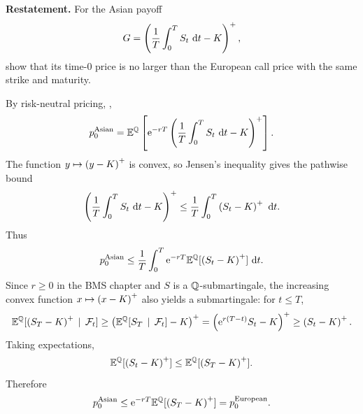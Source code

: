 \begin{exercise}
\textbf{Restatement.}
For the Asian payoff
\[
  G=\left(\frac1T\int_0^T S_t\,\,\mathrm{d} t-K\right)^+,
\]
show that its time-\(0\) price is no larger than the European call price with
the same strike and maturity.

\begin{solution}
By risk-neutral pricing, ,
\[
  p_0^{\mathrm{Asian}}
    =\mathbb{E}^{\mathbb{Q}}\left[
       \mathrm{e}^{-rT}\left(\frac1T\int_0^T S_t\,\,\mathrm{d} t-K\right)^+
     \right].
\]
The function \(y\mapsto\left(y-K\right)^+\) is convex, so Jensen's inequality gives the
pathwise bound
\[
  \left(\frac1T\int_0^T S_t\,\,\mathrm{d} t-K\right)^+
  \le
  \frac1T\int_0^T\left(S_t-K\right)^+\,\,\mathrm{d} t.
\]
Thus
\[
  p_0^{\mathrm{Asian}}
  \le
  \frac1T\int_0^T\mathrm{e}^{-rT}\mathbb{E}^{\mathbb{Q}}[\left(S_t-K\right)^+]\,\,\mathrm{d} t.
\]
Since \(r\ge0\) in the BMS chapter and \(S\) is a \(\mathbb{Q}\)-submartingale, the
increasing convex function \(x\mapsto\left(x-K\right)^+\) also yields a submartingale:
for \(t\le T\),
\[
  \mathbb{E}^{\mathbb{Q}}[\left(S_T-K\right)^+\,\mid\,\mathcal{F}_t]
    \ge \left(\mathbb{E}^{\mathbb{Q}}[S_T\,\mid\,\mathcal{F}_t]-K\right)^+
    =\left(\mathrm{e}^{r(T-t)}S_t-K\right)^+
    \ge \left(S_t-K\right)^+.
\]
Taking expectations,
\[
  \mathbb{E}^{\mathbb{Q}}[\left(S_t-K\right)^+]\le \mathbb{E}^{\mathbb{Q}}[\left(S_T-K\right)^+].
\]
Therefore
\[
  p_0^{\mathrm{Asian}}
    \le \mathrm{e}^{-rT}\mathbb{E}^{\mathbb{Q}}[\left(S_T-K\right)^+]
    =p_0^{\mathrm{European}}.
\]
\end{solution}
\end{exercise}
